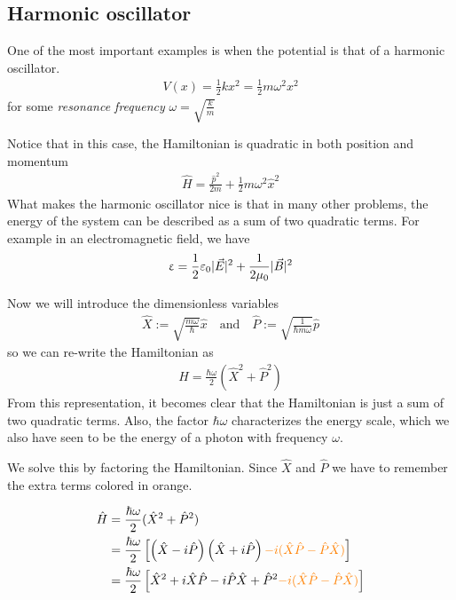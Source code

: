 \subsection{Harmonic oscillator}

One of the most important examples is when the potential is that of a harmonic oscillator.
\begin{align*}
	V(x) = \frac{1}{2}kx^{2} = \frac{1}{2}m \omega^{2} x^{2}
\end{align*}
for some \emph{resonance frequency} $\omega = \sqrt{\frac{k}{m}}$

Notice that in this case, the Hamiltonian is quadratic in both position and momentum
\begin{align*}
	\hat{H} = \frac{\hat{p}^2}{2m} + \frac{1}{2}m \omega^{2} \hat{x}^{2}
\end{align*}
What makes the harmonic oscillator nice is that in many other problems, the energy of the system can be described as a sum of two quadratic terms. For example in an electromagnetic field, we have
\begin{align*}
	\upvarepsilon = \frac{1}{2} \varepsilon_0 \vert\vec{E}\vert^{2} + \frac{1}{2 \mu_0}\vert\vec{B}\vert^{2}
\end{align*}

Now we will introduce the dimensionless variables
\begin{align*}
	\hat{X} := \sqrt{\frac{m \omega}{\hbar}}\hat{x} \quad \text{and} \quad \hat{P} := \sqrt{\frac{1}{\hbar m \omega}} \hat{p}
\end{align*}
so we can re-write the Hamiltonian as
\begin{align*}
	\hat{H} = \frac{\hbar \omega}{2} \left(\hat{X}^{2} + \hat{P}^{2}\right)
\end{align*}
From this representation, it becomes clear that the Hamiltonian is just a sum of two quadratic terms.
Also, the factor $\hbar \omega$ characterizes the energy scale, which we also have seen to be the energy of a photon with frequency $\omega$.

We solve this by factoring the Hamiltonian. Since $\hat{X}$ and $\hat{P}$ we have to remember the extra terms colored in {\color{orange}orange}.

\begin{align*}
	\hat{H} &= \frac{\hbar \omega}{2}(\hat{X}^{2} + \hat{P}^{2})\\
					&= \frac{\hbar \omega}{2}\left[
						\left(\hat{X} - i \hat{P}\right) \left(\hat{X} + i \hat{P}\right) {\color{orange}-i (\hat{X} \hat{P} - \hat{P} \hat{X})}
					\right]\\
					&= \frac{\hbar \omega}{2}\left[
						\hat{X}^{2} + i \hat{X}\hat{P} - i \hat{P} \hat{X} + \hat{P}^{2} {\color{orange}-i (\hat{X} \hat{P} - \hat{P} \hat{X})}
					\right]
\end{align*}

